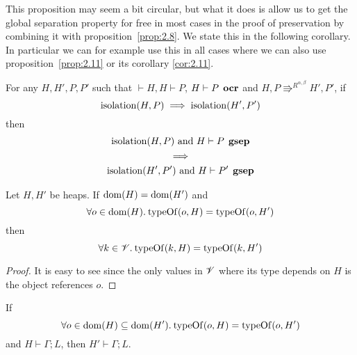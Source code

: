 \begin{remark}
  This proposition may seem a bit circular, but what it does is allow us to get
  the global separation property for free in most cases in the proof of
  preservation by combining it with proposition~\ref{prop:2.8}. We state
  this in the following corollary. In particular we can for example use this in
  all cases where we can also use proposition~\ref{prop:2.11} or its corollary
  \ref{cor:2.11}.
\end{remark}

\begin{corollary} \label{cor:2.9}
  For any $H, H', P, P'$ such that $\vdash H, H \vdash P$, $H \vdash P \:\:
  \mbox{\bf ocr}$ and $H, P \Rrightarrow^{R^{\alpha, \beta}} H', P'$, if
  \begin{equation*}
      \mbox{$\mathrm{isolation}$}(H, P) 
      \implies 
      \mbox{$\mathrm{isolation}$}(H', P')
  \end{equation*}
  then
  \begin{equation*}
    \begin{gathered}
      \mbox{$\mathrm{isolation}$}(H, P) \text{ and } H \vdash P \:\: \mbox{\bf gsep} \\
      \implies \\
      \mbox{$\mathrm{isolation}$}(H', P') \text{ and } H \vdash P' \:\: \mbox{\bf gsep}
    \end{gathered}
  \end{equation*}
\end{corollary}

\begin{proposition} \label{prop:2.12}
  Let $H, H'$ be heaps. If $\mbox{$\mathrm{dom}$}{(H)} = \mbox{$\mathrm{dom}$}{(H')}$ and
  \begin{equation*}
    \forall o \in \mbox{$\mathrm{dom}$}{(H)}. \: \mbox{$\mathrm{typeOf}$}{(o, H)} = \mbox{$\mathrm{typeOf}$}{(o, H')}
  \end{equation*}
  then 
  \begin{equation*}
    \forall k \in \mathscr{V}. \: \mbox{$\mathrm{typeOf}$}{(k, H)} = \mbox{$\mathrm{typeOf}$}{(k, H')}
  \end{equation*}
\end{proposition}

\begin{proof}
  It is easy to see since the only values in $\mathscr{V}$ where its type depends on
  $H$ is the object references $o$.
\end{proof}

\begin{proposition} \label{prop:2.19}
  If
  \begin{equation*}
    \forall o \in \mbox{$\mathrm{dom}$}(H) \subseteq \mbox{$\mathrm{dom}$}(H'). \: \mbox{$\mathrm{typeOf}$}(o, H) = \mbox{$\mathrm{typeOf}$}(o, H')
  \end{equation*}
  and $H \vdash \Gamma; L$, then $H' \vdash \Gamma; L$.
\end{proposition}

